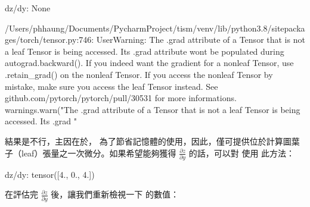 \documentclass[letterpaper,10pt,english]{sphinxmanual}
\begin{document}
\begin{sphinxVerbatim}[commandchars=\\\{\}]
dz/dy:  None
\end{sphinxVerbatim}
\begin{sphinxalltt}
/Users/phhaung/Documents/PycharmProject/tism/venv/lib/python3.8/site\sphinxhyphen{}packages/torch/tensor.py:746: UserWarning: The .grad attribute of a Tensor that is not a leaf Tensor is being accessed. Its .grad attribute won\textquotesingle{}t be populated during autograd.backward(). If you indeed want the gradient for a non\sphinxhyphen{}leaf Tensor, use .retain\_grad() on the non\sphinxhyphen{}leaf Tensor. If you access the non\sphinxhyphen{}leaf Tensor by mistake, make sure you access the leaf Tensor instead. See github.com/pytorch/pytorch/pull/30531 for more informations.
  warnings.warn("The .grad attribute of a Tensor that is not a leaf Tensor is being accessed. Its .grad "

\end{sphinxalltt}

結果是不行，主因在於， 為了節省記憶體的使用，因此，僅可提供位於計算圖葉子（leaf）張量之一次微分。如果希望能夠獲得 \(\frac{\partial z}{\partial y}\) 的話，可以對  使用  此方法：

\begin{sphinxVerbatim}[commandchars=\\\{\}]
      
    
 
\end{sphinxVerbatim}

\begin{sphinxVerbatim}[commandchars=\\\{\}]
dz/dy:  tensor([\PYGZhy{}4.,  0.,  4.])
\end{sphinxVerbatim}

在評估完 \(\frac{\partial z}{\partial y}\) 後，讓我們重新檢視一下  的數值：

\begin{sphinxVerbatim}[commandchars=\\\{\}]
 
\end{sphinxVerbatim}
\end{document}
